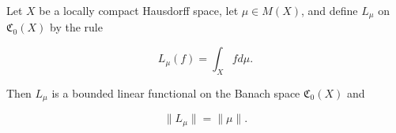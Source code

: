 Let $X$ be a locally compact Hausdorff space, let $\mu \in M(X)$, and define $L_\mu$ on $\mathfrak{C}_0(X)$ by the rule

$$L_\mu(f) = \int_X f d\mu.$$

Then $L_\mu$ is a bounded linear functional on the Banach space $\mathfrak{C}_0(X)$ and

$$\|L_\mu\| = \|\mu\|.$$
